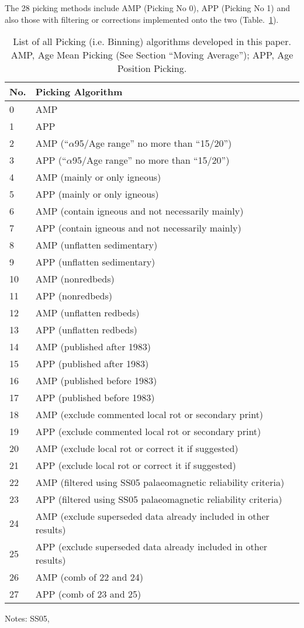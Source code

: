 The 28 picking methods include AMP (Picking No 0), APP (Picking No 1) and also
those with filtering or corrections implemented onto the two
(Table.~\ref{tab-pick}).

\begin{table}
\centering
\caption{List of all Picking (i.e. Binning) algorithms developed in this paper.
         AMP, Age Mean Picking (See Section ``Moving Average''); APP, Age
         Position Picking.}\label{tab-pick}
\begin{tabular}{@{}ll@{}}
\toprule
No. & Picking Algorithm \\ \midrule
0 & AMP \\
1 & APP \\
2 & AMP (``$\alpha$95/Age range'' no more than ``15/20'') \\
3 & APP (``$\alpha$95/Age range'' no more than ``15/20'') \\
4 & AMP (mainly or only igneous) \\
5 & APP (mainly or only igneous) \\
6 & AMP (contain igneous and not necessarily mainly) \\
7 & APP (contain igneous and not necessarily mainly) \\
8 & AMP (unflatten sedimentary) \\
9 & APP (unflatten sedimentary) \\
10 & AMP (nonredbeds) \\
11 & APP (nonredbeds) \\
12 & AMP (unflatten redbeds) \\
13 & APP (unflatten redbeds) \\
14 & AMP (published after 1983) \\
15 & APP (published after 1983) \\
16 & AMP (published before 1983) \\
17 & APP (published before 1983) \\
18 & AMP (exclude commented local rot or secondary print) \\
19 & APP (exclude commented local rot or secondary print) \\
20 & AMP (exclude local rot or correct it if suggested) \\
21 & APP (exclude local rot or correct it if suggested) \\
22 & AMP (filtered using SS05 palaeomagnetic reliability criteria) \\
23 & APP (filtered using SS05 palaeomagnetic reliability criteria) \\
24 & AMP (exclude superseded data already included in other results) \\
25 & APP (exclude superseded data already included in other results) \\
26 & AMP (comb of 22 and 24) \\
27 & APP (comb of 23 and 25) \\ \bottomrule
\end{tabular}
\raggedright{Notes: SS05,~\cite{S05}}
\end{table}

